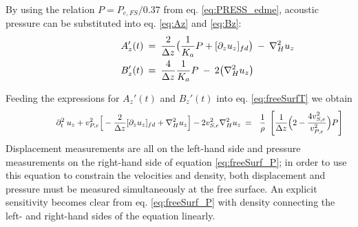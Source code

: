 \documentclass{article} %
\begin{document}
	By using the relation $P=P_{e,FS}/0.37$ from eq. \eqref{eq:PRESS_edme}, acoustic pressure can be substituted into eq. \eqref{eq:Az} and \eqref{eq:Bz}:
	\begin{align} \shoveright \shoveright \shoveright \shoveright \shoveright \shoveright 
		A_{z}'(t)  	\: &= \:   \frac{2}{\Delta z} \big(\frac{1}{K_{a}}P + [\partial_{z} u_{z}]_{fd} \big) \: - \: \nabla^{2}_{H} u_{z} \label{eq:Az_new}  \\
		B_{z}'(t) 	\: &= \:   \frac{4}{\Delta z} \frac{1}{K_{a}}P \: - \: 2\big(\nabla^{2}_{H}u_{z}\big)
		\label{eq:Bz_new}   
	\end{align}

	Feeding the expressions for $A_{z}'(t) $ and $B_{z}'(t) $ into eq. \eqref{eq:freeSurfT} we obtain
	\begin{align} \shoveright \shoveright \shoveright \shoveright \shoveright \shoveright 
		\partial_{t}^{2} \: u_{z}  +  v_{P,e}^{2} \Big[ - \frac{2}{\Delta z}  [\partial_{z} u_{z}]_{fd} +  \nabla_{H}^{2}u_{z} \Big] - 2 v_{S,e}^{2} \nabla_{H}^{2}u_{z}  \: &=  \: \: \: \frac{1}{\rho} \: \;  \Bigg[ \frac{1}{\Delta z} \Big( 2 - \frac{4v_{S,e}^{2}}{v_{P,e}^{2}}\Big) P\Bigg]
		\label{eq:freeSurf_P}   
	\end{align}
	Displacement measurements are all on the left-hand side and pressure measurements on the right-hand side of equation \eqref{eq:freeSurf_P}; in order to use this equation to constrain the velocities and density, both displacement and pressure must be measured simultaneously at the free surface. An explicit sensitivity becomes clear from eq. \eqref{eq:freeSurf_P} with density connecting the left- and right-hand sides of the equation linearly.\\
\end{document}
